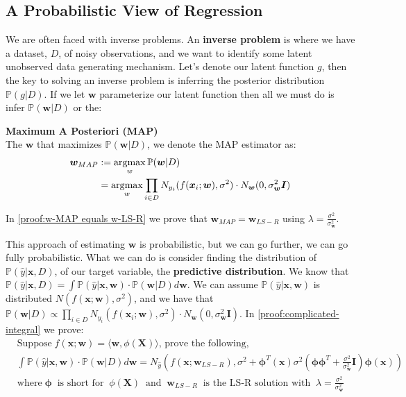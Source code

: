 \subsection{A Probabilistic View of Regression}
We are often faced with inverse problems. An \textbf{inverse problem} is where we have a dataset, $D$, of noisy observations, and we want to identify some latent unobserved data generating mechanism. Let's denote our latent function $g$, then the key to solving an inverse problem is inferring the posterior distribution $\mathbb{P}(g|D)$. If we let $\bm{w}$ parameterize our latent function then all we must do is infer $\mathbb{P}(\bm{w}|D)$ or the:
\begin{definition}
    \textbf{Maximum A Posteriori (MAP)} \\
    The $\bm{w}$ that maximizes $\mathbb{P}(\bm{w}|D)$, we denote the MAP estimator as:
    \begin{align}
        \bm{w}_{MAP} &{} := \operatorname*{arg\!\max}_{w} \mathbb{P}(\bm{w}|D) \\
        & = \operatorname*{arg\!\max}_{w} \prod_{i \in D} N_{y_{i}}(f(\bm{x}_{i} ; \bm{w}), \sigma^{2}) \cdot N_{\bm{w}}(0, \sigma_{\bm{w}}^{2} \bm{I})
    \end{align}
\end{definition}
In \cref{proof:w-MAP equals w-LS-R} we prove that $\bm{w}_{MAP} = \bm{w}_{LS-R}$ using $\lambda = \frac{\sigma^{2}}{\sigma_{\bm{w}}^{2}}$.

This approach of estimating $\bm{w}$ is probabilistic, but we can go further, we can go fully probabilistic. What we can do is consider finding the distribution of $\mathbb{P}(\hat{y}|\bm{x},D)$, of our target variable, the \textbf{predictive distribution}. We know that $\mathbb{P}(\hat{y}|\bm{x},D) = \int \mathbb{P}(\hat{y}|\bm{x},\bm{w}) \cdot \mathbb{P}(\bm{w}|D) d \bm{w}$. We can assume $\mathbb{P}(\hat{y}|\bm{x},\bm{w})$ is distributed $N(f(\bm{x};\bm{w}),\sigma^{2})$, and we have that $\mathbb{P}(\bm{w}|D) \propto \prod_{i \in D} N_{y_{i}}(f(\bm{x}_{i};\bm{w}), \sigma^{2}) \cdot N_{\bm{w}} (0, \sigma_{\bm{w}}^{2} \bm{I})$. In \cref{proof:complicated-integral} we prove:
\begin{equation} \label{eqn:complicated-integral}
    \begin{aligned}
    &{} \text{Suppose} \; f(\bm{x};\bm{w}) = \langle \bm{w}, \phi(\bm{X}) \rangle \text{, prove the following,} \\
    & \int \mathbb{P} (\hat{y}|\bm{x},\bm{w}) \cdot \mathbb{P}(\bm{w}|D) d \bm{w} = N_{\hat{y}}(f(\bm{x};\bm{w}_{LS-R}), \sigma^{2} + \bm{\phi}^{T}(\bm{x}) \sigma^{2} (\bm{\phi} \bm{\phi}^{T} + \frac{\sigma^{2}}{\sigma_{\bm{w}}^{2}} \bm{I}) \bm{\phi}(\bm{x})) \\
    & \text{where} \; \bm{\phi} \; \; \text{is short for} \; \; \phi(\bm{X}) \; \; \text{and} \; \; \bm{w}_{LS-R} \; \; \text{is the LS-R solution with} \; \; \lambda = \frac{\sigma^{2}}{\sigma_{\bm{w}}^{2}}
    \end{aligned}
\end{equation}